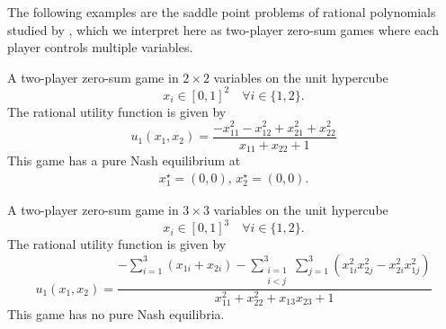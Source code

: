 
The following examples are the saddle point problems of rational polynomials studied by \textcite{zhou.wang.ea:saddle}, which we interpret here as two-player zero-sum games where each player controls multiple variables.

\begin{game}\label{ex.zhou19.5.3.i}
A two-player zero-sum game in $2 \times 2$ variables on the unit hypercube
\[
x_i \in [0,1]^2 \quad \forall i \in \{1,2\}.
\]
The rational utility function \cite[Example~5.3 (i)]{zhou.wang.ea:saddle} is given by
\[
u_1(x_1, x_2) =
\frac{
- x_{11}^2 - x_{12}^2 + x_{21}^2 + x_{22}^2
}{
x_{11} + x_{22} + 1
}
\]
This game has a pure Nash equilibrium at
\begin{align*}
x_1^\star = (0, 0),\, x_2^\star = (0, 0).
\end{align*}
\end{game}


\begin{game}\label{ex.zhou19.5.3.ii}
A two-player zero-sum game in $3 \times 3$ variables on the unit hypercube
\[
x_i \in [0,1]^3 \quad \forall i \in \{1,2\}.
\]
The rational utility function \cite[Example~5.3 (ii)]{zhou.wang.ea:saddle} is given by
\[
u_1(x_1, x_2) =
\frac{
- \sum_{i=1}^{3} (x_{1i} + x_{2i}) - \sum_{\substack{i=1 \\ i < j}}^{3} \sum_{j=1}^{3} (x_{1i}^2 x_{2j}^2 - x_{2i}^2 x_{1j}^2)
}{
x_{11}^2 + x_{22}^2 + x_{13} x_{23} + 1
}
\]
This game has no pure Nash equilibria.
\end{game}



